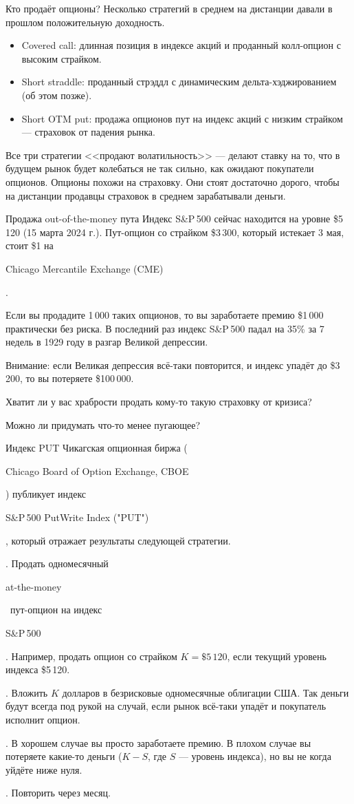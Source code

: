 \documentclass{beamer}
\newcommand{\en}[1]{\begin{otherlanguage}{english}#1\end{otherlanguage}}
\begin{document}
\begin{frame}{Кто продаёт опционы?}
\justify
Несколько стратегий в среднем на дистанции давали в прошлом положительную доходность.

\justify
\begin{itemize}
\justifying
\item Covered call: длинная позиция в индексе акций и проданный колл-опцион с высоким страйком.
\item Short straddle: проданный стрэддл с динамическим дельта-хэджированием (об этом позже).
\item Short OTM put: продажа опционов пут на индекс акций с низким страйком --- страховок от падения рынка.
\end{itemize}

\justify
Все три стратегии <<продают волатильность>> --- делают ставку на то, что в будущем рынок будет колебаться не так сильно, как ожидают покупатели опционов. Опционы похожи на страховку. Они стоят достаточно дорого, чтобы на дистанции продавцы страховок в среднем зарабатывали деньги.
\end{frame}



\begin{frame}{Продажа out-of-the-money пута}
\justify
Индекс S\&P\,500 сейчас находится на уровне \$5\,120 (15 марта 2024 г.). Пут-опцион со страйком \$3\,300, который истекает 3 мая, стоит \$1 на \en{Chicago Mercantile Exchange (CME)}.

\justify
Если вы продадите 1\,000 таких опционов, то вы заработаете премию \$1\,000 практически без риска. В последний раз индекс S\&P\,500 падал на 35\% за 7 недель в 1929 году в разгар Великой депрессии.

\justify
Внимание: если Великая депрессия всё-таки повторится, и индекс упадёт до \$3\,200, то вы потеряете \$100\,000.

\justify
Хватит ли у вас храбрости продать кому-то такую страховку от кризиса?

\justify
Можно ли придумать что-то менее пугающее?
\end{frame}



\begin{frame}{Индекс PUT}
\justify
Чикагская опционная биржа (\en{Chicago Board of Option Exchange, CBOE}) публикует индекс \en{S\&P\,500 PutWrite Index ("PUT")}, который отражает результаты следующей стратегии.

. Продать одномесячный \en{at-the-money}\ пут-опцион на индекс \en{S\&P\,500}. Например, продать опцион со страйком $K=\$5\,120$, если текущий уровень индекса \$5\,120.

. Вложить $K$ долларов в безрисковые одномесячные облигации США. Так деньги будут всегда под рукой на случай, если рынок всё-таки упадёт и покупатель исполнит опцион.

. В хорошем случае вы просто заработаете премию. В плохом случае вы потеряете какие-то деньги ($K-S$, где $S$ --- уровень индекса), но вы не когда уйдёте ниже нуля.

. Повторить через месяц.
\end{frame}
\end{document}
